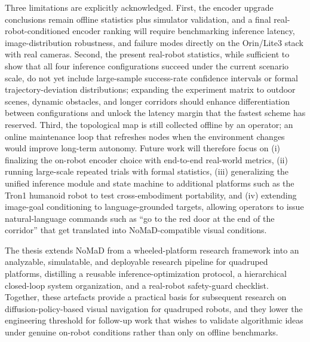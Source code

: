 \begin{digest}[en]
Three limitations are explicitly acknowledged. First, the encoder upgrade conclusions
remain offline statistics plus simulator validation, and a final
real-robot-conditioned encoder ranking will require benchmarking inference latency,
image-distribution robustness, and failure modes directly on the Orin/Lite3 stack with
real cameras. Second, the present real-robot statistics, while sufficient to show that
all four inference configurations succeed under the current scenario scale, do not yet
include large-sample success-rate confidence intervals or formal trajectory-deviation
distributions; expanding the experiment matrix to outdoor scenes, dynamic obstacles,
and longer corridors should enhance differentiation between configurations and unlock
the latency margin that the fastest scheme has reserved. Third, the topological map is still
collected offline by an operator; an online maintenance loop that refreshes nodes when
the environment changes would improve long-term autonomy. Future work will therefore
focus on (i) finalizing the on-robot encoder choice with end-to-end real-world
metrics, (ii) running large-scale repeated trials with formal statistics, (iii)
generalizing the unified inference module and state machine to additional platforms
such as the Tron1 humanoid robot to test cross-embodiment portability, and (iv)
extending image-goal conditioning to language-grounded targets, allowing operators to
issue natural-language commands such as ``go to the red door at the end of the
corridor'' that get translated into NoMaD-compatible visual conditions.

The thesis extends NoMaD from a wheeled-platform research framework into an
analyzable, simulatable, and deployable research pipeline for quadruped platforms,
distilling a reusable inference-optimization protocol, a hierarchical closed-loop
system organization, and a real-robot safety-guard checklist. Together, these
artefacts provide a practical basis for subsequent research on diffusion-policy-based
visual navigation for quadruped robots, and they lower the engineering threshold for
follow-up work that wishes to validate algorithmic ideas under genuine on-robot
conditions rather than only on offline benchmarks.

\end{digest}
